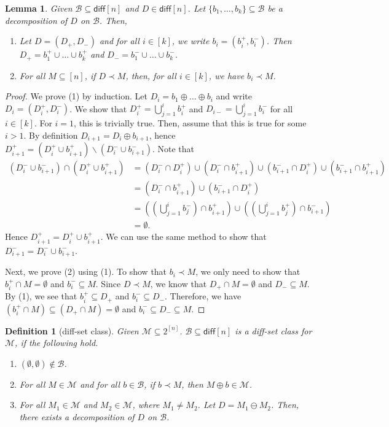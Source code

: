 \documentclass{article}
\newtheorem{define}{Definition}
\newtheorem{lemma}{Lemma}
\newcommand{\M}{\mathcal M}
\newcommand{\diff}{\mathsf{diff}}
\newcommand{\diffvalid}{\prec}
\newcommand{\B}{\mathcal B}
\newcommand{\del}{\backslash}
\begin{document}
\begin{spacing}{1.1}
\begin{lemma}
Given $\B\subseteq \diff[n]$ and $D\in \diff[n]$.
Let $\{b_1,\ldots,b_k\} \subseteq \B$ be a decomposition of $D$ on $\B$.
Then,
\begin{enumerate}
\item Let $D=(D_+,D_-)$ and for all $i \in [k]$, we write $b_i = (b_i^+,b_i^-)$.
	  Then $D_+=b_1^+ \cup \ldots \cup b_k^+$ and $D_-=b_1^-\cup\ldots\cup b_k^-$.
\item For all $M\subseteq [n]$, if $D\diffvalid M$, then, for all $i\in [k]$, we have $b_i \diffvalid M$.
\end{enumerate}
\end{lemma}

\begin{proof}
We prove (1) by induction.
Let $D_i = b_1 \oplus \ldots \oplus b_i$ and write $D_i=(D_i^+, D_i^-)$.
We show that $D_i^+=\bigcup_{j=1}^i b_i^+$ and $D_{i-}=\bigcup_{j=1}^i b_i^-$ for all $i\in[k]$.
For $i=1$, this is trivially true.
Then, assume that this is true for some $i>1$.
By definition $D_{i+1}=D_{i}\oplus b_{i+1}$, hence $D_{i+1}^+=(D_i^+ \cup b_{i+1}^+)\del(D_i^- \cup b_{i+1}^-)$.
Note that 
\begin{align*}
(D_i^-\cup b_{i+1}^-)\cap(D_i^+ \cup b_{i+1}^+) &= (D_i^-\cap D_i^+)\cup(D_i^- \cap b_{i+1}^+)\cup(b_{i+1}^- \cap D_i^+)\cup(b_{i+1}^- \cap b_{i+1}^+)\\
		&= (D_i^- \cap b_{i+1}^+) \cup (b_{i+1}^- \cap D_i^+) \\
		&= \left(\left(\bigcup_{j=1}^i b_{j}^-\right) \cap b_{i+1}^+ \right) \cup \left(\left(\bigcup_{j=1}^i b_{j}^+\right) \cap b_{i+1}^- \right)\\
		&= \emptyset.
\end{align*}
Hence $D_{i+1}^+=D_i^+ \cup b_{i+1}^+$. We can use the same method to show that $D_{i+1}^-=D_i^- \cup b_{i+1}^-$.

Next, we prove (2) using (1).
To show that $b_i\diffvalid M$, we only need to show that $b_i^+ \cap M = \emptyset$ and $b_i^- \subseteq M$.
Since $D\diffvalid M$, we know that $D_+\cap M=\emptyset$ and $D_-\subseteq M$.
By (1), we see that $b_i^+\subseteq D_+$ and $b_i^-\subseteq D_-$.
Therefore, we have $(b_i^+\cap M) \subseteq (D_+\cap M) = \emptyset$ and $b_i^-\subseteq D_- \subseteq M$.

\end{proof}


\begin{define}[diff-set class]
\label{define:diff-class}
Given $\M \subseteq 2^{[n]}$. $\B \subseteq \diff[n]$ is a diff-set class for $\M$, if the following hold.
\begin{enumerate} 
\item $(\emptyset,\emptyset)\not\in \B$.
\item For all $M\in \M$ and for all $b\in \B$, if $b\diffvalid M$, then $M\oplus b \in \M$.
\item For all $M_1 \in \M$ and $M_2\in \M$, where $M_1\not=M_2$. 	
	  Let $D=M_1\ominus M_2$.  
	  Then, there exists a decomposition of $D$ on $\B$.
\end{enumerate}
\end{define}


\end{spacing}
\end{document}
